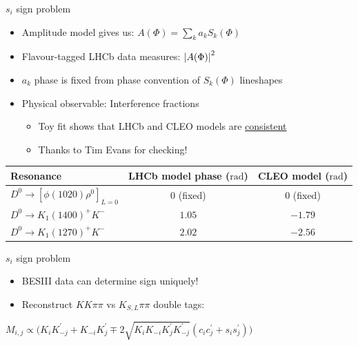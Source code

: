 \documentclass{beamer}
\begin{document}
\begin{frame}{$s_i$ sign problem}
  \begin{itemize}
    \setlength\itemsep{0.5em}
    \item{Amplitude model gives us: $A(\Phi) = \sum_ka_kS_k(\Phi)$}
    \item{Flavour-tagged LHCb data measures: $\abs{A(\Phi)}^2$}
    \item{$a_k$ phase is fixed from phase convention of $S_k(\Phi)$ lineshapes}
    \item{Physical observable: Interference fractions}
    \begin{itemize}
      \item{Toy fit shows that LHCb and CLEO models are \underline{consistent}}
      \item{Thanks to Tim Evans for checking!}
    \end{itemize}
  \end{itemize}
  \vspace{0.4cm}
  \begin{tabular}{l|c|c}
    Resonance                           & LHCb model phase ($\si{\radian}$) & CLEO model ($\si{\radian}$) \\
    \hline
    $D^0\to[\phi(1020)\rho^0]_{L = 0}$  & $0$ (fixed)                       & $0$ (fixed) \\
    $D^0\to K_1(1400)^+K^-$             & $1.05$                            & $-1.79$ \\
    $D^0\to K_1(1270)^+K^-$             & $2.02$                            & $-2.56$ \\
    \hline
  \end{tabular}
  \vspace{0.4cm}
\end{frame}

\begin{frame}{$s_i$ sign problem}
  \begin{itemize}
    \setlength\itemsep{1.5em}
    \item{BESIII data can determine sign uniquely!}
    \item{Reconstruct $KK\pi\pi$ vs $K_{S,L}\pi\pi$ double tags:}
  \end{itemize}
  \begin{center}
    $M_{i, j}\propto\big(K_iK^\prime_{-j} + K_{-i}K^\prime_j \mp 2\sqrt{K_iK_{-i}K^\prime_jK^\prime_{-j}}(c_ic^\prime_j + s_is^\prime_j)\big)$
  \end{center}
\end{frame}
\end{document}

